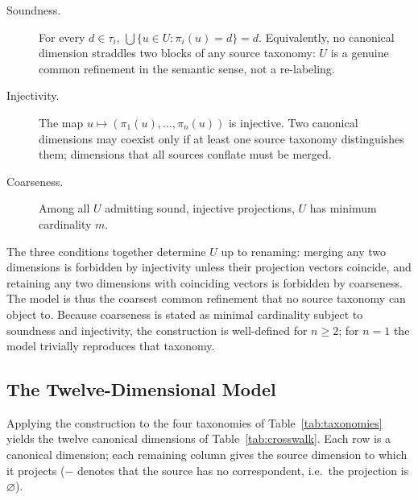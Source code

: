 \documentclass[conference]{IEEEtran}
\begin{document}
\begin{description}
\item[Soundness.] For every $d \in \tau_i$, $\bigcup\{u \in U : \pi_i(u)=d\} = d$. Equivalently, no canonical dimension straddles two blocks of any source taxonomy: $U$ is a genuine common refinement in the semantic sense, not a re-labeling.
\item[Injectivity.] The map $u \mapsto (\pi_1(u),\dots,\pi_n(u))$ is injective. Two canonical dimensions may coexist only if at least one source taxonomy distinguishes them; dimensions that all sources conflate must be merged.
\item[Coarseness.] Among all $U$ admitting sound, injective projections, $U$ has minimum cardinality $m$.
\end{description}

The three conditions together determine $U$ up to renaming: merging any two dimensions is forbidden by injectivity unless their projection vectors coincide, and retaining any two dimensions with coinciding vectors is forbidden by coarseness. The model is thus the coarsest common refinement that no source taxonomy can object to. Because coarseness is stated as minimal cardinality subject to soundness and injectivity, the construction is well-defined for $n \geq 2$; for $n=1$ the model trivially reproduces that taxonomy.

\subsection{The Twelve-Dimensional Model}

Applying the construction to the four taxonomies of Table~\ref{tab:taxonomies} yields the twelve canonical dimensions of Table~\ref{tab:crosswalk}. Each row is a canonical dimension; each remaining column gives the source dimension to which it projects ($-$ denotes that the source has no correspondent, i.e.\ the projection is $\varnothing$).
\end{document}
